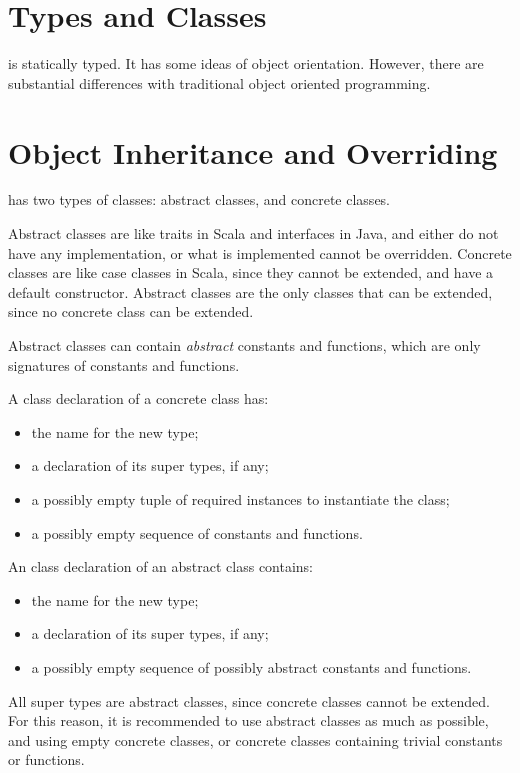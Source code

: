\section{Types and Classes}

\Soda is statically typed.
It has some ideas of object orientation.
However, there are substantial differences with traditional object oriented programming.


\section{Object Inheritance and Overriding}

\Soda has two types of classes: abstract classes, and concrete classes.

Abstract classes are like traits in Scala and interfaces in Java, and either do not have any implementation, or what is implemented cannot be overridden.
Concrete classes are like case classes in Scala, since they cannot be extended, and have a default constructor.
Abstract classes are the only classes that can be extended, since no concrete class can be extended.

Abstract classes can contain \textit{abstract} constants and functions, which are only signatures of constants and functions.

A class declaration of a concrete class has:
\begin{itemize}
    \item the name for the new type;
    \item a declaration of its super types, if any;
    \item a possibly empty tuple of required instances to instantiate the class;
    \item a possibly empty sequence of constants and functions.
\end{itemize}


An class declaration of an abstract class contains:
\begin{itemize}
    \item the name for the new type;
    \item a declaration of its super types, if any;
    \item a possibly empty sequence of possibly abstract constants and functions.
\end{itemize}

All super types are abstract classes, since concrete classes cannot be extended.
For this reason, it is recommended to use abstract classes as much as possible, and using empty concrete classes, or concrete classes containing trivial constants or functions.

